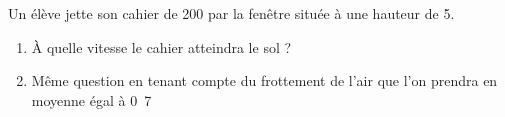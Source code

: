 

\begin{exercice}\label{exo038}

Un élève jette son cahier de \unit{200}{\gram} par la fenêtre située à une hauteur de \unit{5}{\meter}. 
\begin{enumerate}
\item À quelle vitesse le cahier atteindra le sol ?
\item Même question en tenant compte du frottement de l'air que l'on prendra en moyenne égal à \unit{0.7}{\newton}
\end{enumerate}


\end{exercice}
